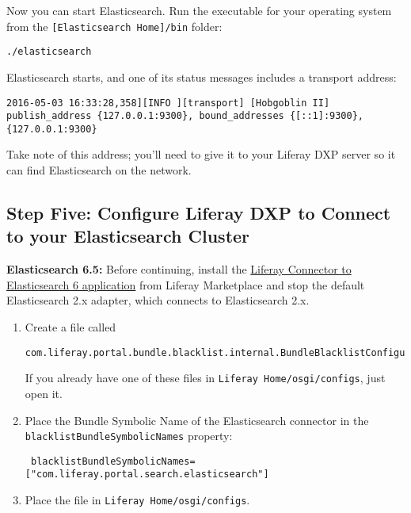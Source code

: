 Now you can start Elasticsearch. Run the executable for your operating
system from the \texttt{{[}Elasticsearch\ Home{]}/bin} folder:

\begin{verbatim}
./elasticsearch
\end{verbatim}

Elasticsearch starts, and one of its status messages includes a
transport address:

\begin{verbatim}
2016-05-03 16:33:28,358][INFO ][transport] [Hobgoblin II] publish_address {127.0.0.1:9300}, bound_addresses {[::1]:9300}, {127.0.0.1:9300}
\end{verbatim}

Take note of this address; you'll need to give it to your Liferay DXP
server so it can find Elasticsearch on the network.

\subsection{Step Five: Configure Liferay DXP to Connect to your
Elasticsearch
Cluster}\label{step-five-configure-liferay-dxp-to-connect-to-your-elasticsearch-cluster}

\noindent\hrulefill

\textbf{Elasticsearch 6.5:} Before continuing, install the
\href{https://web.liferay.com/marketplace}{Liferay Connector to
Elasticsearch 6 application} from Liferay Marketplace and stop the
default Elasticsearch 2.x adapter, which connects to Elasticsearch 2.x.

\begin{enumerate}
\def\labelenumi{\arabic{enumi}.}
\item
  Create a file called

\begin{verbatim}
com.liferay.portal.bundle.blacklist.internal.BundleBlacklistConfiguration.config
\end{verbatim}

  If you already have one of these files in
  \texttt{Liferay\ Home/osgi/configs}, just open it.
\item
  Place the Bundle Symbolic Name of the Elasticsearch connector in the
  \texttt{blacklistBundleSymbolicNames} property:

\begin{verbatim}
 blacklistBundleSymbolicNames=["com.liferay.portal.search.elasticsearch"]
\end{verbatim}
\item
  Place the file in \texttt{Liferay\ Home/osgi/configs}.
\end{enumerate}

